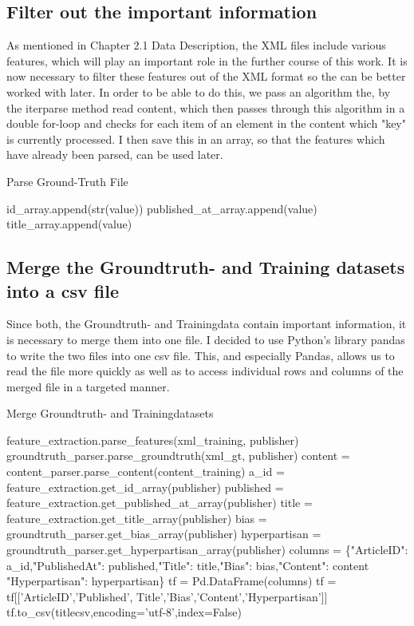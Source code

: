 \documentclass[a4paper, 11pt,titlepage,oneside,openany]{book}
\begin{document}
\subsection{Filter out the important information}
As mentioned in Chapter 2.1 Data Description, the XML files include various features, which will play an important role in the further course of this work. It is now necessary to filter these features out of the XML format so the can be better worked with later. In order to be able to do this, we pass an algorithm the, by the iterparse method read content, which then passes through this algorithm in a double for-loop and checks for each item of an element in the content which "key" is currently processed. I then save this in an array, so that the features which have already been parsed, can be used later. \\
\noindent
\begin{algorithm}[H]
	\DontPrintSemicolon
	\caption{Parse Ground-Truth File}
		{
			{
				{id\_array.append(str(value))}
				{published\_at\_array.append(value)}
				{title\_array.append(value)}
			}
		}
\end{algorithm}

\subsection{Merge the Groundtruth- and Training datasets into a csv file}
Since both, the Groundtruth- and Trainingdata contain important information, it is necessary to merge them into one file. I decided to use Python's library pandas to write the two files into one csv file. This, and especially Pandas, allows us to read the file more quickly as well as to access individual rows and columns of the merged file in a targeted manner.\\
\noindent
\begin{algorithm}[H]
	\DontPrintSemicolon
	\caption{Merge Groundtruth- and Trainingdatasets}
	feature\_extraction.parse\_features(xml\_training, publisher)\;
	groundtruth\_parser.parse\_groundtruth(xml\_gt, publisher)\;
	content = content\_parser.parse\_content(content\_training)\;
	a\_id = feature\_extraction.get\_id\_array(publisher)\;
	\BlankLine
	\BlankLine
	published = feature\_extraction.get\_published\_at\_array(publisher)\;
	title = feature\_extraction.get\_title\_array(publisher)\;
	bias = groundtruth\_parser.get\_bias\_array(publisher)\;
	hyperpartisan = groundtruth\_parser.get\_hyperpartisan\_array(publisher)\;
	columns = \{"ArticleID": a\_id,"PublishedAt": published,"Title": title,"Bias": bias,"Content": content "Hyperpartisan": hyperpartisan\}\;
	\BlankLine
	\BlankLine
	tf = Pd.DataFrame(columns)\;
	tf = tf[['ArticleID','Published', Title','Bias','Content','Hyperpartisan']]\;
	tf.to\_csv(titlecsv,encoding='utf-8',index=False)\;
\end{algorithm}
\end{document}
